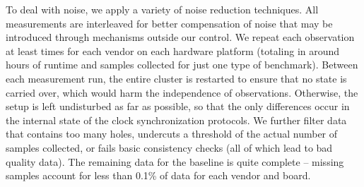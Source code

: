 {%
%
%

To deal with noise, we apply a variety of noise reduction techniques.
All measurements are interleaved for better compensation of noise that may be
introduced through mechanisms outside our control.
We repeat each observation at least \numBaselineMeasurements{} times for each
vendor on each hardware platform (totaling in around
 hours of runtime and
 samples collected for just one
type of benchmark).
Between each measurement run, the entire cluster is restarted to ensure that no
state is carried over, which would harm the independence of observations.
Otherwise, the setup is left undisturbed as far as possible, so that the only
differences occur in the internal state of the clock synchronization protocols.
We further filter data that contains too many holes,
undercuts a threshold of the actual number of samples collected,
or fails basic consistency checks (all of which lead to bad quality data).
The remaining data for the baseline is quite complete -- missing samples account
for less than 0.1\% of data for each vendor and board.

}

